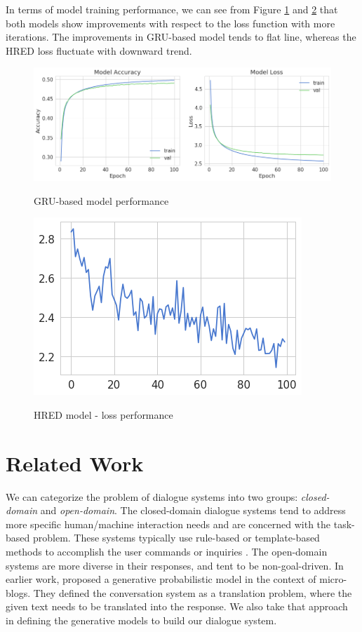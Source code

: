 In terms of model training performance, we can see from Figure \ref{fig:gru_generative} and \ref{fig:HRED_generative} that both models show improvements with respect to the loss function with more iterations. The improvements in GRU-based model tends to flat line, whereas the HRED loss fluctuate with downward trend.  


\begin{figure}[!ht]
    \centering
  	\caption{GRU-based model performance}
	\includegraphics[width=\linewidth]{img/gru_generative}
  	\label{fig:gru_generative}
\end{figure}
\vspace{-0.9em}
\begin{figure}[!ht]
    \centering
  	\caption{HRED model - loss performance}
	\includegraphics[scale=0.7]{img/HRED_loss}
  	\label{fig:HRED_generative}
\end{figure}

\section{Related Work}
We can categorize the problem of dialogue systems into two groups: \textit{closed-domain} and \textit{open-domain}. The closed-domain dialogue systems tend to address more specific human/machine interaction needs and are concerned with the task-based problem. These systems typically use rule-based or template-based methods to accomplish the user commands or inquiries \cite{DBLP:journals/corr/WilliamsZ16}. The open-domain systems are more diverse in their responses, and tent to be non-goal-driven. In earlier work, \cite{Ritter:2011} proposed a generative probabilistic model in the context of micro-blogs. They defined the conversation system as a translation problem, where the given text needs to be translated into the response. We also take that approach in defining the generative models to build our dialogue system.  

